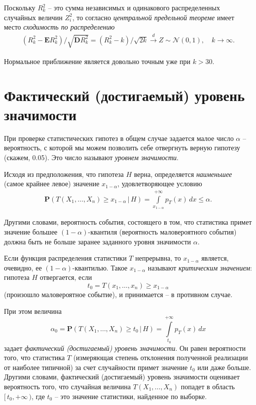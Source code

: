 \documentclass[%
	11pt,
	a4paper,
	utf8,
		]{article}
\begin{document}
Поскольку $ R_k^2 $ -- это сумма независимых и одинакового распределенных случайных величин $ Z_i^2 $, то согласно \emph{центральной предельной теореме} имеет место \emph{сходимость по распределению}
\begin{align*}
	(R_k^2 - \mathbf{E}R_k^2) / \sqrt{\mathbf{D}R_k^2} = (R_k^2 - k)/\sqrt{2 k} \xrightarrow{d} Z \sim \mathcal{N}(0, 1), \quad k \to \infty.
\end{align*}

Нормальное приближение является довольно точным уже при $ k > 30 $.


\section{Фактический (достигаемый) уровень значимости}

При проверке статистических гипотез в общем случае задается малое число $ \alpha $ -- вероятность, с которой мы можем позволить себе отвергнуть верную гипотезу (скажем, 0.05). Это число называют \emph{уровнем значимости}.

Исходя из предположения, что гипотеза $ H $ верна, определяется \emph{наименьшее} (самое крайнее левое) значение $ x_{1 - \alpha} $, удовлетворяющее условию
\begin{align*}
	\mathbf{P}(T(X_1, \dots, X_n) \geqslant x_{1 - \alpha} \,|\, H) = \int\limits_{x_{1 - \alpha}}^{+\infty} p_T(x)\,dx \leqslant \alpha.
\end{align*}

Другими словами, вероятность события, состоящего в том, что статистика примет значение большее $ (1 - \alpha) $-квантиля (вероятность маловероятного события) должна быть не больше заранее заданного уровня значимости $ \alpha $.

Если функция распределения статистики $ T $ непрерывна, то $ x_{1 - \alpha} $ является, очевидно, ее $ (1 - \alpha) $-квантилью. Такое $ x_{1 - \alpha} $ называют \emph{критическим значением}: гипотеза $ H $ отвергается, если
$$ t_0 = T(x_1, \dots, x_n) \geqslant x_{1 - \alpha} $$ (произошло маловероятное событие), и принимается -- в противном случае.

При этом величина
$$ \alpha_0 = \mathbf{P}(T(X_1, \dots, X_n) \geqslant t_0 \,|\, H) = \int\limits_{t_0}^{+\infty} p_T(x)\,dx $$
задает \emph{фактический (достигаемый) уровень значимости}. Он равен вероятности того, что статистика $ T $ (измеряющая степень отклонения полученной реализации от наиболее типичной) за счет случайности примет значение $ t_0 $ или даже больше. Другими словами, фактический (достигаемый) уровень значимости оценивает вероятность того, что случайная величина $ T(X_1, \dots, X_n) $ попадет в область $ [\,t_0, +\infty\,) $, где $ t_0 $ -- это значение статистики, найденное по выборке.
\end{document}
